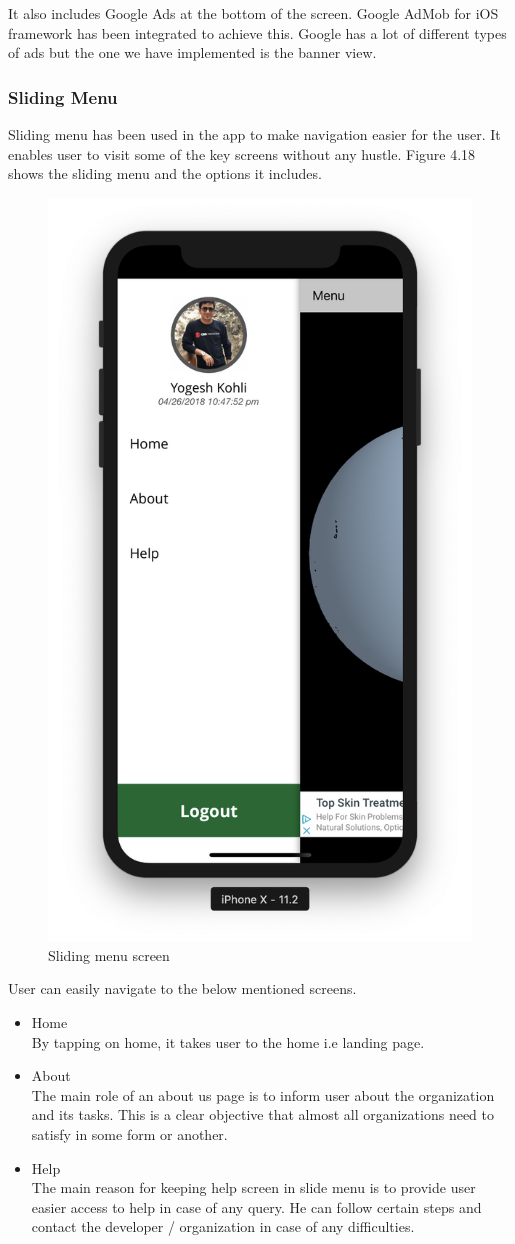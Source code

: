     It also includes Google Ads at the bottom of the screen. Google AdMob for \gls{iOS} framework has been integrated to achieve this. Google has a lot of different types of ads but the one we have implemented is the banner view.

\subsubsection{Sliding Menu}

Sliding menu has been used in the app to make navigation easier for the user. It enables user to visit some of the key screens without any hustle. Figure 4.18 shows the sliding menu and the options it includes.

    \begin{figure}[H]
            \centering
            \includegraphics[width=0.25\linewidth]{figures/ch4/side_menu.png}
            \caption{\label{fig:side_menu_ch4} Sliding menu screen}
    \end{figure}

    User can easily navigate to the below mentioned screens.

    \begin{itemize}
    \item Home \\
    By tapping on home, it takes user to the home i.e landing page.
    
        \item About \\
            The main role of an about us page is to inform user about the organization and its tasks. This is a clear objective that almost all organizations need to satisfy in some form or another.
    
         \item Help \\
            The main reason for keeping help screen in slide menu is to provide user easier access to help in case of any query. He can follow certain steps and contact the developer / organization in case of any difficulties.
            
    \end{itemize}

